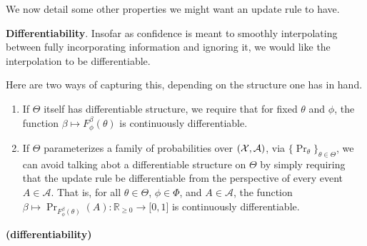 \documentclass{article}
\begin{document}
We now detail some other properties we might want an update rule to have.

\textbf{Differentiability}.
Insofar as confidence is meant to smoothly interpolating between fully incorporating information and ignoring it, we would like the interpolation to be differentiable.

Here are two ways of capturing this, depending on the structure one has in hand.


\begin{URaxioms}
    \item \label{ax:diffble}
    \begin{enumerate}
    \item If $\Theta$ itself has differentiable structure, we require that
        for fixed $\theta$ and $\phi$, the function $\beta \mapsto F^{\beta}_\phi(\theta)$
        is continuously differentiable. %
    \item If $\Theta$ parameterizes a family of probabilities over $(\mathcal X, \mathcal A)$,
        via $\{ \Pr_\theta \}_{\theta \in \Theta}$, we can avoid talking abot a differentiable structure on $\Theta$ by simply requiring that the update rule be differentiable from the perspective of every event $A \in \mathcal A$.
        That is,
        for all $\theta \in \Theta$, $\phi \in \Phi$, and  $A \in \mathcal A$,
        the function $\beta \mapsto \Pr_{F^{\beta}_\phi(\theta)}(A)
        : \mathbb R_{\ge 0} \to \mathbb [0,1]$ is
        continuously differentiable.
            \label{ax:diffble2}
    \end{enumerate}
    \hfill \textbf{(differentiability)}
\end{URaxioms}

\end{document}
